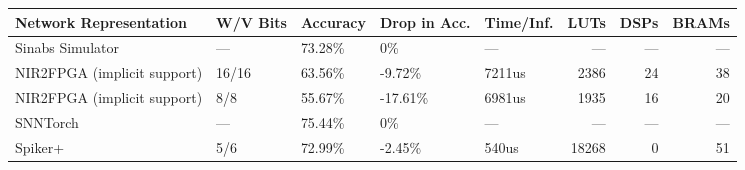 \begin{center}
\begin{tabular}{lllllrrr}
\hline
Network Representation & W/V Bits & Accuracy & Drop in Acc. & Time/Inf. & LUTs & DSPs & BRAMs\\
\hline
Sinabs Simulator & --- & 73.28\% & 0\% & --- & --- & --- & ---\\
\hline
NIR2FPGA (implicit support) & 16/16 & 63.56\% & -9.72\% & 7211us & 2386 & 24 & 38\\
NIR2FPGA (implicit support) & 8/8 & 55.67\% & -17.61\% & 6981us & 1935 & 16 & 20\\
\hline
\hline
SNNTorch & --- & 75.44\% & 0\% & --- & --- & --- & ---\\
Spiker+ & 5/6 & 72.99\% & -2.45\% & 540us & 18268 & 0 & 51\\
\hline
\end{tabular}
\end{center}

